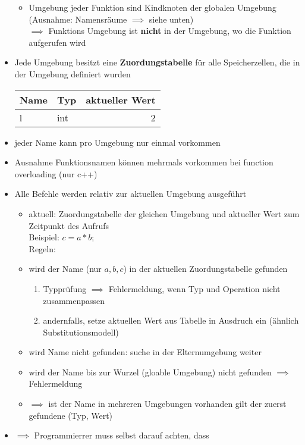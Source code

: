 \documentclass[a4paper]{scrartcl}
\theoremstyle{definition}
\theoremstyle{plain}
\theoremstyle{remark}
\theoremstyle{remark}
\begin{document}
\begin{itemize}
\begin{itemize}
\item Umgebung jeder Funktion sind Kindknoten der globalen Umgebung (Ausnahme: Namensräume $\implies$ siehe unten) \\
      $\implies$ Funktions Umgebung ist \textbf{nicht} in der Umgebung, wo die Funktion aufgerufen wird
\end{itemize}
\item Jede Umgebung besitzt eine \textbf{Zuordungstabelle} für alle Speicherzellen, die in der Umgebung definiert wurden
\begin{center}
\begin{tabular}{llr}
Name & Typ & aktueller Wert\\
\hline
l & int & 2\\
\end{tabular}
\end{center}
\item jeder Name kann pro Umgebung nur einmal vorkommen
\item Ausnahme Funktionsnamen können mehrmals vorkommen bei function overloading (nur c++)
\item Alle Befehle werden relativ zur aktuellen Umgebung ausgeführt
\begin{itemize}
\item aktuell: Zuordungstabelle der gleichen Umgebung und aktueller Wert zum Zeitpunkt des Aufrufs \\
      Beispiel: $c = a * b;$ \\
      Regeln:
\item wird der Name (nur $a, b, c$) in der aktuellen Zuordungstabelle gefunden
\begin{enumerate}
\item Typprüfung $\implies$ Fehlermeldung, wenn Typ und Operation nicht zusammenpassen
\item andernfalls, setze aktuellen Wert aus Tabelle in Ausdruch ein (ähnlich Substitutionsmodell)
\end{enumerate}
\item wird Name nicht gefunden: suche in der Elternumgebung weiter
\item wird der Name bis zur Wurzel (gloable Umgebung) nicht gefunden $\implies$ Fehlermeldung
\item $\implies$ ist der Name in mehreren Umgebungen vorhanden gilt der zuerst gefundene (Typ, Wert)
\end{itemize}
\item $\implies$ Programmierrer muss selbst darauf achten, dass

\end{itemize}
\end{document}
